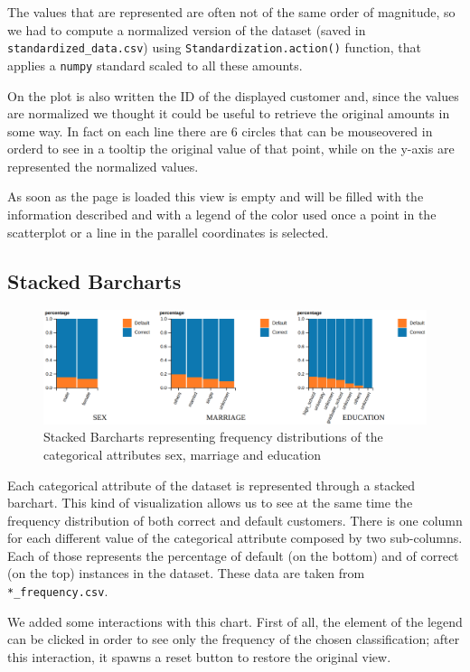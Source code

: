 \documentclass[journal]{vgtc}                %
\begin{document}
The values that are represented are often not of the same order of magnitude, so we had to compute a normalized version of the dataset (saved in \texttt{standardized\_data.csv}) using \texttt{Standardization.action()} function, that applies
a \texttt{numpy} standard scaled to all these amounts.

On the plot is also written the ID of the displayed customer and, since the values are normalized we thought it could be useful to retrieve the original amounts in some way. In fact on each line there are 6 circles that can be mouseovered in orderd to see in a tooltip
the original value of that point, while on the y-axis are represented the normalized values.

As soon as the page is loaded this view is empty and will be filled with the information described and with a legend of the color used once a point in the scatterplot or a line in the parallel coordinates is selected.

\subsection{Stacked Barcharts}
\begin{figure}[h]
  \centering
  \includegraphics[scale=0.15]{stacked}
  \caption{Stacked Barcharts representing frequency distributions of the categorical attributes sex, marriage and education}
  \label{stacked}
\end{figure}

Each categorical attribute of the dataset is represented through a stacked barchart. This kind of visualization allows us to see at the same time the frequency distribution of both correct and default customers.
There is one column for each different value of the categorical attribute composed by two sub-columns. Each of those represents the percentage of default (on the bottom) and of correct (on the top) instances in the dataset.
These data are taken from \texttt{*\_frequency.csv}.

We added some interactions with this chart. First of all, the element of the legend can be clicked in order to see only the frequency of the chosen classification;
after this interaction, it spawns a reset button to restore the original view.
\end{document}
